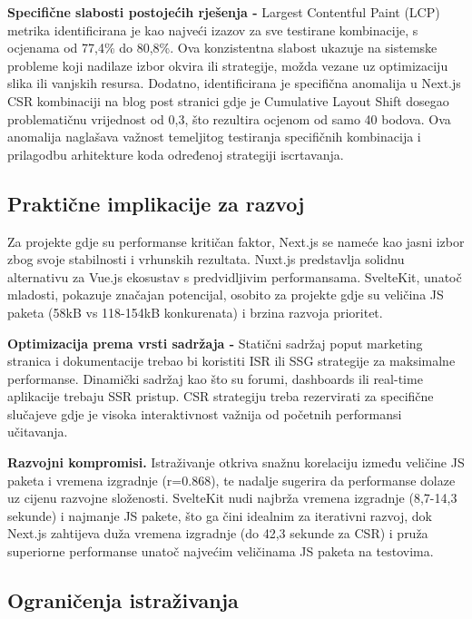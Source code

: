 \textbf{Specifične slabosti postojećih rješenja -} Largest Contentful Paint (LCP) metrika identificirana je kao najveći izazov za sve testirane kombinacije, s ocjenama od 77,4\% do 80,8\%. Ova konzistentna slabost ukazuje na sistemske probleme koji nadilaze izbor okvira ili strategije, možda vezane uz optimizaciju slika ili vanjskih resursa. Dodatno, identificirana je specifična anomalija u Next.js CSR kombinaciji na blog post stranici gdje je Cumulative Layout Shift dosegao problematičnu vrijednost od 0,3, što rezultira ocjenom od samo 40 bodova. Ova anomalija naglašava važnost temeljitog testiranja specifičnih kombinacija i prilagodbu arhitekture koda određenoj strategiji iscrtavanja.

\subsection{Praktične implikacije za razvoj}

Za projekte gdje su performanse kritičan faktor, Next.js se nameće kao jasni izbor zbog svoje stabilnosti i vrhunskih rezultata. Nuxt.js predstavlja solidnu alternativu za Vue.js ekosustav s predvidljivim performansama. SvelteKit, unatoč mladosti, pokazuje značajan potencijal, osobito za projekte gdje su veličina JS paketa (58kB vs 118-154kB konkurenata) i brzina razvoja prioritet.

\textbf{Optimizacija prema vrsti sadržaja -} Statični sadržaj poput marketing stranica i dokumentacije trebao bi koristiti ISR ili SSG strategije za maksimalne performanse. Dinamički sadržaj kao što su forumi, dashboards ili real-time aplikacije trebaju SSR pristup. CSR strategiju treba rezervirati za specifične slučajeve gdje je visoka interaktivnost važnija od početnih performansi učitavanja.

\textbf{Razvojni kompromisi.} Istraživanje otkriva snažnu korelaciju između veličine JS paketa i vremena izgradnje (r=0.868), te nadalje sugerira da performanse dolaze uz cijenu razvojne složenosti. SvelteKit nudi najbrža vremena izgradnje (8,7-14,3 sekunde) i najmanje JS pakete, što ga čini idealnim za iterativni razvoj, dok Next.js zahtijeva duža vremena izgradnje (do 42,3 sekunde za CSR) i pruža superiorne performanse unatoč najvećim veličinama JS paketa na testovima.

\subsection{Ograničenja istraživanja}

